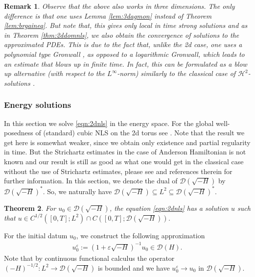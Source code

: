 \documentclass[11pt, oneside]{article}   	%
\newtheorem{theorem}{Theorem}[section]
\newtheorem{remark}[theorem]{Remark}
\newcommand{\ED}{\mathscr{D} ( \sqrt{-H})}
\newcommand{\ssp}{\mathscr{H}}
\begin{document}
\begin{remark}\upshape\upshape\label{rem:nls3dagmon}
	Observe that the above also works in three dimensions.  The only difference is that one uses Lemma \ref{lem:3dagmon} instead of Theorem \ref{lem:brgaineq}.  But note that, this gives only local in time strong solutions and as in Theorem \ref{thm:2ddomnls}, we also obtain the convergence of solutions to the approximated PDEs.  This is due to the fact that, unlike the 2d case, one uses a polynomial type Gronwall \cite{Dra03}, as opposed to a logarithmic Gronwall, which leads to an estimate that blows up in finite time.  In fact, this can be formulated as a blow up alternative (with respect to the $L^\infty$-norm) similarly to the classical case of $\ssp^2$-solutions \cite{cazenave2003semilinear}.
\end{remark}
\subsubsection{Energy solutions}

In this section we solve \eqref{eqn:2dnls} in the energy space. For the global well-posedness of (standard) cubic NLS on the 2d torus see \cite{bourgain1993fourier}. Note that the result we get here is somewhat weaker, since we obtain  only existence and partial regularity in time.  But the Strichartz estimates in the case of Anderson Hamiltonian is not known and our result is still as good as what one would get in the classical case without the use of Strichartz estimates, please see \cite{BGT04} and references therein for further information.  In this section, we denote the dual of $\ED$ by $\ED^{\ast}$.  So,  we naturally have $\ED \subseteq L^2 \subseteq \ED^{\ast}$. 

\begin{theorem}\label{thm:2dnlsenergy} 
	For $u_0 \in \ED$, the equation \eqref{eqn:2dnls} has a solution $u$ such that $u \in C^{1 / 2} ([0, T]; L^2) \cap C([0,T]; \ED)$.
\end{theorem}
For the initial datum $u_0$, we construct the following approximation
\begin{align*}
u^\varepsilon_0:=(1+\varepsilon \sqrt{-H})^{-1}u_0\in \mathscr{D}(H).
\end{align*}
Note that by continuous functional calculus the operator $(- H)^{-1/2}:L^2\to \ED$ is bounded and we have $u^\varepsilon_0\to u_0$ in $\ED.$
\end{document}
